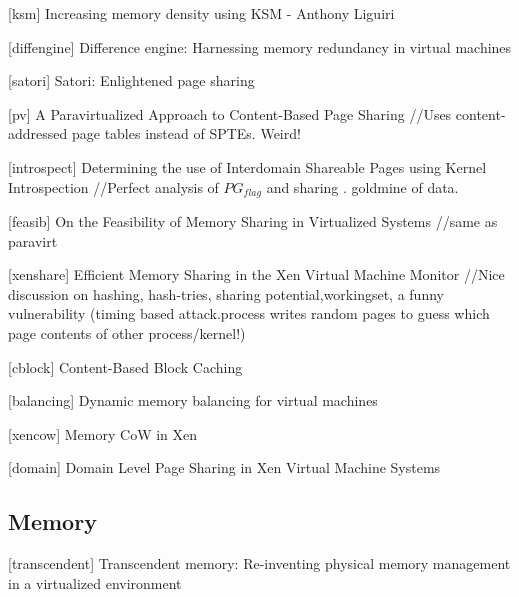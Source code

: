 \documentclass[10pt,a4paper]{article}
\begin{document}
[ksm] Increasing memory density using KSM - Anthony Liguiri

[diffengine] Difference engine: Harnessing memory redundancy in virtual machines

[satori] Satori: Enlightened page sharing

[pv] A Paravirtualized Approach to Content-Based Page Sharing 
//Uses content-addressed page tables instead of SPTEs. Weird!

[introspect] Determining the use of Interdomain Shareable Pages using Kernel Introspection
//Perfect analysis of $PG_{flag}$ and sharing . goldmine of data.

[feasib] On the Feasibility of Memory Sharing in Virtualized Systems
//same as paravirt

[xenshare] Efficient Memory Sharing in the Xen Virtual Machine Monitor 
//Nice discussion on hashing, hash-tries, sharing potential,workingset, a funny
vulnerability (timing based attack.process writes random pages to
guess which page contents of other process/kernel!)

[cblock] Content-Based Block Caching

[balancing] Dynamic memory balancing for virtual machines

[xencow] Memory CoW in Xen

[domain] Domain Level Page Sharing in Xen Virtual Machine Systems

\subsection{Memory}

[transcendent] Transcendent memory: Re-inventing physical memory management in a virtualized environment
\end{document}
